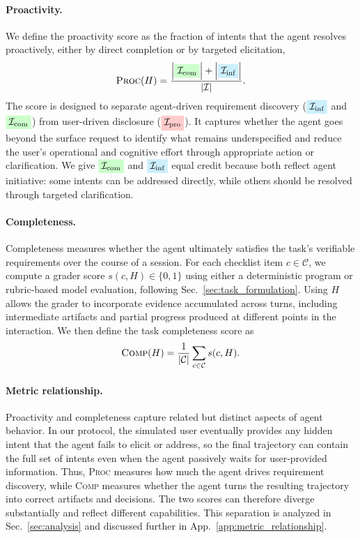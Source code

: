 \documentclass{llmxive}
\providecommand{\intentcompleted}{\colorbox{green!20}{$\mathcal{I}_\text{com}$}}
\providecommand{\intentinferred}{\colorbox{cyan!20}{$\mathcal{I}_\text{inf}$}}
\providecommand{\intentprovided}{\colorbox{red!20}{$\mathcal{I}_\text{pro}$}}
\begin{document}
\paragraph{Proactivity.}
We define the proactivity score as the fraction of intents that the agent resolves proactively, either by direct completion or by targeted elicitation,
\begin{equation}
\textsc{Proc}(H)=\frac{\left|{\intentcompleted}\right|+\left|{\intentinferred}\right|}{|\mathcal{I}|}.
\end{equation}
The score is designed to separate agent-driven requirement discovery ($\intentinferred$ and $\intentcompleted$) from user-driven disclosure ($\intentprovided$). It captures whether the agent goes beyond the surface request to identify what remains underspecified and reduce the user’s operational and cognitive effort through appropriate action or clarification. We give $\intentcompleted$ and $\intentinferred$ equal credit because both reflect agent initiative: some intents can be addressed directly, while others should be resolved through targeted clarification.

\paragraph{Completeness.}
Completeness measures whether the agent ultimately satisfies the task’s verifiable requirements over the course of a session. For each checklist item $c\in\mathcal{C}$, we compute a grader score $s(c,H)\in\{0,1\}$ using either a deterministic program or rubric-based model evaluation, following Sec.~\ref{sec:task_formulation}. Using $H$ allows the grader to incorporate evidence accumulated across turns, including intermediate artifacts and partial progress produced at different points in the interaction. We then define the task completeness score as
\begin{equation}
\textsc{Comp}(H)=\frac{1}{|\mathcal{C}|}\sum_{c\in\mathcal{C}} s(c,H).
\end{equation}
\paragraph{Metric relationship.}
Proactivity and completeness capture related but distinct aspects of agent behavior. In our protocol, the simulated user eventually provides any hidden intent that the agent fails to elicit or address, so the final trajectory can contain the full set of intents even when the agent passively waits for user-provided information. Thus, \textsc{Proc} measures how much the agent drives requirement discovery, while \textsc{Comp} measures whether the agent turns the resulting trajectory into correct artifacts and decisions. The two scores can therefore diverge substantially and reflect different capabilities. This separation is analyzed in Sec.~\ref{sec:analysis} and discussed further in App.~\ref{app:metric_relationship}.
\end{document}
